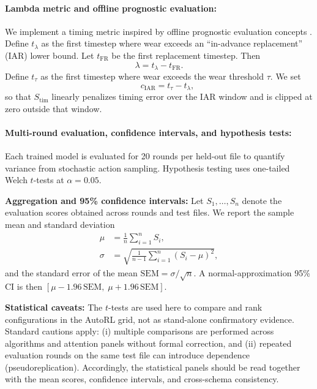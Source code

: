 \documentclass[sn-basic]{sn-jnl} %
\begin{document}
\paragraph{Lambda metric and offline prognostic evaluation:}
We implement a timing metric inspired by offline prognostic evaluation concepts \cite{Saxena2010Metrics}. Define $t_{\lambda}$ as the first timestep where wear exceeds an ``in-advance replacement'' (IAR) lower bound. Let $t_{\mathrm{FR}}$ be the first replacement timestep. Then
\begin{equation}
		\lambda = t_{\lambda} - t_{\mathrm{FR}}.
\end{equation}
Define $t_{\tau}$ as the first timestep where wear exceeds the wear threshold $\tau$. We set
\begin{equation}
\qquad c_{\mathrm{IAR}} = t_{\tau}-t_{\lambda},
\end{equation}
so that $S_{\text{tim}}$ linearly penalizes timing error over the IAR window and is clipped at zero outside that window.

\paragraph{Multi-round evaluation, confidence intervals, and hypothesis tests:}
Each trained model is evaluated for 20 rounds per held-out file to quantify variance from stochastic action sampling. Hypothesis testing uses one-tailed Welch $t$-tests at $\alpha=0.05$.

\textbf{Aggregation and 95\% confidence intervals:}
Let $S_1,\ldots,S_n$ denote the evaluation scores obtained across rounds and test files. We report the sample mean and standard deviation
\begin{align}
\mu &= \frac{1}{n}\sum_{i=1}^{n} S_i,\\
\sigma &= \sqrt{\frac{1}{n-1}\sum_{i=1}^{n}(S_i-\mu)^2},
\end{align}
and the standard error of the mean $\mathrm{SEM}=\sigma/\sqrt{n}$. A normal-approximation 95\% CI is then $[\mu-1.96\,\mathrm{SEM},\;\mu+1.96\,\mathrm{SEM}]$.

\textbf{Statistical caveats:}
The $t$-tests are used here to compare and rank configurations in the AutoRL grid, not as stand-alone confirmatory evidence. Standard cautions apply: (i) multiple comparisons are performed across algorithms and attention panels without formal correction, and (ii) repeated evaluation rounds on the same test file can introduce dependence (pseudoreplication). Accordingly, the statistical panels should be read together with the mean scores, confidence intervals, and cross-schema consistency.
\end{document}
